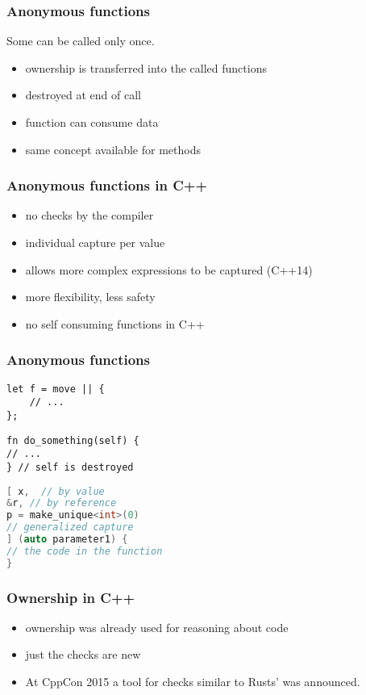 \documentclass[xcolor=colortbl
]{beamer}
\begin{document}
\begin{frame}
    \frametitle{Anonymous functions}
    Some can be called only once.
    
    \begin{itemize}
        \item ownership is transferred into the called functions
        \item destroyed at end of call
        \item function can consume data
        \item same concept available for methods
    \end{itemize}
\end{frame}


\begin{frame}
    \frametitle{Anonymous functions in C++}    
    \begin{itemize}
        \item no checks by the compiler
        \item individual capture per value
        \item allows more complex expressions to be captured (C++14)
        \item more flexibility, less safety
        \item no self consuming functions in C++
    \end{itemize}
\end{frame}

\begin{frame}
    \frametitle{Anonymous functions}
\begin{lstlisting}[frame=single]
let f = move || {
    // ...
};
\end{lstlisting}

\begin{lstlisting}[frame=single]
fn do_something(self) {
// ...
} // self is destroyed
\end{lstlisting}

\begin{lstlisting}[language=c++, frame=single]
[ x,  // by value
&r, // by reference
p = make_unique<int>(0)
// generalized capture
] (auto parameter1) {
// the code in the function
}
\end{lstlisting}
\end{frame}


\begin{frame}
    \frametitle{Ownership in C++}    
    \begin{itemize}
        \item ownership was already used for reasoning about code
        \item just the checks are new
        \item At CppCon 2015 a tool for checks similar to Rusts' was announced.
    \end{itemize}
\end{frame}
\end{document}
